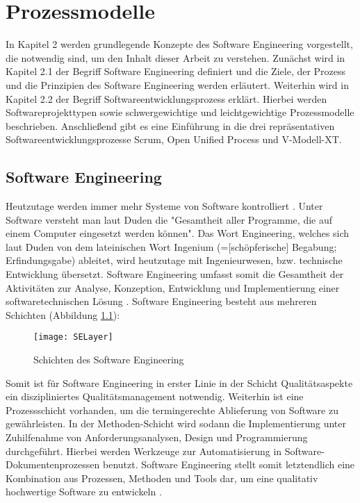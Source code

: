 \chapter{Prozessmodelle}\label{sec:chapter2}

In Kapitel 2 werden grundlegende Konzepte des Software Engineering vorgestellt, die notwendig sind, um den Inhalt dieser Arbeit zu verstehen. Zunächst wird in Kapitel 2.1 der Begriff Software Engineering definiert und die Ziele, der Prozess und die Prinzipien des Software Engineering werden erläutert. Weiterhin wird in Kapitel 2.2 der Begriff Softwareentwicklungsprozess erklärt. Hierbei werden Softwareprojekttypen sowie schwergewichtige und leichtgewichtige Prozessmodelle beschrieben. Anschließend gibt es eine Einführung in die drei repräsentativen Softwareentwicklungsprozesse Scrum, Open Unified Process und V-Modell-XT.

\section{Software Engineering}\label{sec:chapter2: Software Engineering}
Heutzutage werden immer mehr Systeme von Software kontrolliert \cite{Puntambekar2007}. Unter Software versteht man laut Duden die "Gesamtheit aller Programme, die auf einem Computer eingesetzt werden können". Das Wort Engineering, welches sich laut Duden von dem lateinischen Wort Ingenium (=[schöpferische] Begabung; Erfindungsgabe) ableitet, wird heutzutage mit Ingenieurwesen, bzw. technische Entwicklung übersetzt. Software Engineering umfasst somit die Gesamtheit der Aktivitäten zur Analyse, Konzeption, Entwicklung und Implementierung einer softwaretechnischen Lösung \cite{Specker1998}.
Software Engineering besteht aus mehreren Schichten (Abbildung \ref{fig:SchichtenSE}):

\begin{figure}[htp]
\begin{center}
  \texttt{[image: SELayer]} %
  \caption{Schichten des Software Engineering \cite{Puntambekar2007}}
  \label{fig:SchichtenSE}
\end{center}
\end{figure}

Somit ist für Software Engineering in erster Linie in der Schicht Qualitätsaspekte ein diszipliniertes Qualitätsmanagement notwendig. Weiterhin ist eine Prozessschicht vorhanden, um die termingerechte Ablieferung von Software zu gewährleisten. In der Methoden-Schicht wird sodann die Implementierung unter Zuhilfenahme von Anforderungsanalysen, Design und Programmierung durchgeführt. Hierbei werden Werkzeuge zur Automatisierung in Software- Dokumentenprozessen benutzt. Software Engineering stellt somit letztendlich eine Kombination aus Prozessen, Methoden und Tools dar, um eine qualitativ hochwertige Software zu entwickeln \cite{Puntambekar2007}.

